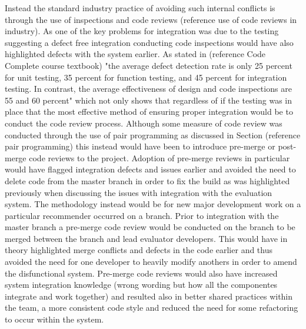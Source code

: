 \documentclass{l3proj}
\begin{document}
Instead the standard industry practice of avoiding such internal conflicts is through the use of inspections and code reviews (reference use of code reviews in industry). As one of the key problems for integration was due to the testing suggesting a defect free integration conducting code inspections would have also highlighted defects with the system earlier. As stated in (reference Code Complete course textbook) "the average defect detection rate is only 25 percent for unit testing, 35 percent for function testing, and 45 percent for integration testing. In contrast, the average effectiveness of design and code inspections are 55 and 60 percent" which not only shows that regardless of if the testing was in place that the most effective method of ensuring proper integration would be to conduct the code review process. Although some measure of code review was conducted through the use of pair programming as discussed in Section (reference pair programming) this instead would have been to introduce pre-merge or post-merge code reviews to the project. Adoption of pre-merge reviews in particular would have flagged integration defects and issues earlier and avoided the need to delete code from the master branch in order to fix the build as was highlighted previously when discussing the issues with integration with the evaluation system. The methodology instead would be for new major development work on a particular recommender occurred on a branch. Prior to integration with the master branch a pre-merge code review would be conducted on the branch to be merged between the branch and lead evaluator developers. This would have in theory highlighted merge conflicts and defects in the code earlier and thus avoided the need for one developer to heavily modify anothers in order to amend the disfunctional system. Pre-merge code reviews would also have increased system integration knowledge (wrong wording but how all the componentes integrate and work together) and resulted also in better shared practices within the team, a more consistent code style and reduced the need for some refactoring to occur within the system. 
\end{document}
